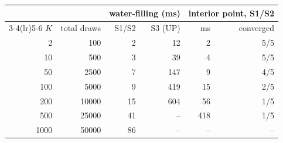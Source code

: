 \begin{tabular}{rrrrrr}
\toprule
 & & \multicolumn{2}{c}{water-filling (ms)} & \multicolumn{2}{c}{interior point, S1/S2}\\
\cmidrule(lr){3-4}\cmidrule(lr){5-6}
$K$ & total draws & S1/S2 & S3 (UP) & ms & converged\\
\midrule
2 & 100 & 2 & 12 & 2 & 5/5\\
10 & 500 & 3 & 39 & 4 & 5/5\\
50 & 2500 & 7 & 147 & 9 & 4/5\\
100 & 5000 & 9 & 419 & 15 & 2/5\\
200 & 10000 & 15 & 604 & 56 & 1/5\\
500 & 25000 & 41 & -- & 418 & 1/5\\
1000 & 50000 & 86 & -- & -- & --\\
\bottomrule
\end{tabular}
